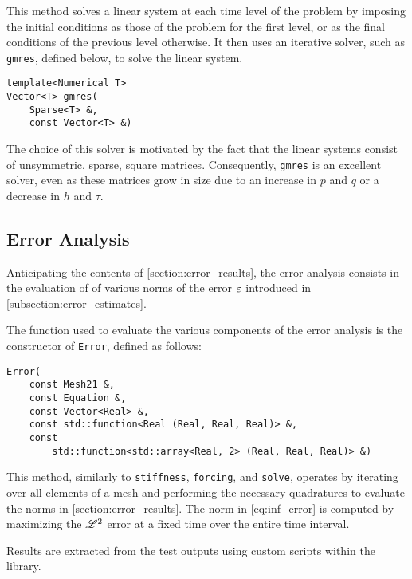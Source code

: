 This method solves a linear system at each time level of the problem by imposing the initial conditions as those of the problem for the first level, or as the final conditions of the previous level otherwise. It then uses an iterative solver, such as \lstinline{gmres}, defined below, to solve the linear system.

\begin{lstlisting}[style=cpp]
template<Numerical T>
Vector<T> gmres(
    Sparse<T> &,
    const Vector<T> &)
\end{lstlisting}

The choice of this solver is motivated by the fact that the linear systems consist of unsymmetric, sparse, square matrices. Consequently, \lstinline{gmres} is an excellent solver, even as these matrices grow in size due to an increase in $p$ and $q$ or a decrease in $h$ and $\tau$.

\newpage
\subsection{Error Analysis}

Anticipating the contents of \cref{section:error_results}, the error analysis consists in the evaluation of of various norms of the error $\varepsilon$ introduced in \cref{subsection:error_estimates}.

The function used to evaluate the various components of the error analysis is the constructor of \lstinline{Error}, defined as follows:
\begin{lstlisting}[style=cpp]
Error(
    const Mesh21 &, 
    const Equation &, 
    const Vector<Real> &, 
    const std::function<Real (Real, Real, Real)> &, 
    const 
        std::function<std::array<Real, 2> (Real, Real, Real)> &)
\end{lstlisting}

This method, similarly to \lstinline{stiffness}, \lstinline{forcing}, and \lstinline{solve}, operates by iterating over all elements of a mesh and performing the necessary quadratures to evaluate the norms in \cref{section:error_results}. The norm in \cref{eq:inf_error} is computed by maximizing the $\mathscr{L}^{2}$ error at a fixed time over the entire time interval.

Results are extracted from the test outputs using custom scripts within the library.